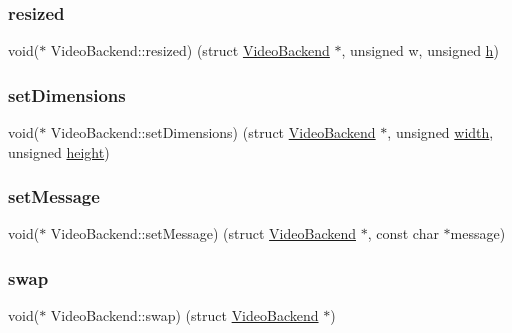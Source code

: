 \subsubsection{\texorpdfstring{resized}{resized}}
{\footnotesize\ttfamily void($\ast$ Video\+Backend\+::resized) (struct \mbox{\hyperlink{struct_video_backend}{Video\+Backend}} $\ast$, unsigned w, unsigned \mbox{\hyperlink{isa-lr35902_8c_a06a62682361411df32cf88f75a0b8da4}{h}})}

\mbox{\label{struct_video_backend_adc237c2c1d9ee05e0db9af4bc7fdfb9f}} 
\subsubsection{\texorpdfstring{set\+Dimensions}{setDimensions}}
{\footnotesize\ttfamily void($\ast$ Video\+Backend\+::set\+Dimensions) (struct \mbox{\hyperlink{struct_video_backend}{Video\+Backend}} $\ast$, unsigned \mbox{\hyperlink{struct_video_backend_a462affa3c14c45e8b0dae4c5f8dfa205}{width}}, unsigned \mbox{\hyperlink{struct_video_backend_a163ee12ec8ae96107bca8e4f95f783eb}{height}})}

\mbox{\label{struct_video_backend_a0c72a2ee942fed4012f63b661bec56dd}} 
\subsubsection{\texorpdfstring{set\+Message}{setMessage}}
{\footnotesize\ttfamily void($\ast$ Video\+Backend\+::set\+Message) (struct \mbox{\hyperlink{struct_video_backend}{Video\+Backend}} $\ast$, const char $\ast$message)}

\mbox{\label{struct_video_backend_a95e980321b06846b3bfa1220e19bd913}} 
\subsubsection{\texorpdfstring{swap}{swap}}
{\footnotesize\ttfamily void($\ast$ Video\+Backend\+::swap) (struct \mbox{\hyperlink{struct_video_backend}{Video\+Backend}} $\ast$)}

